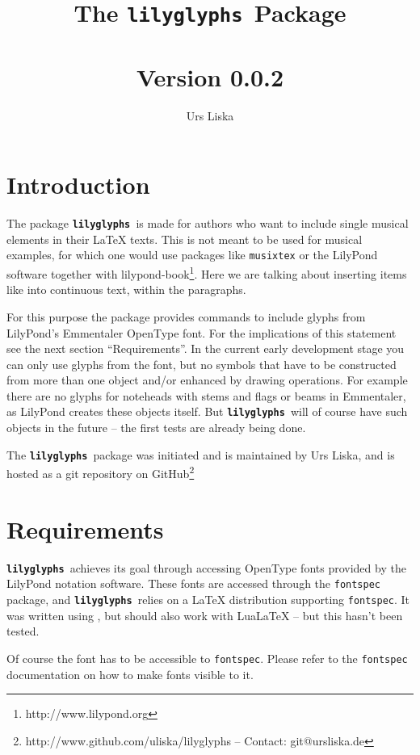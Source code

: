 \documentclass{article}
\newcommand{\lilyglyphs}{\texttt{\textbf{lilyglyphs\,}}}
\begin{document}
\title{The \lilyglyphs Package\\~\\
	\normalsize Version 0.0.2}
\author{Urs Liska}

\maketitle
\tableofcontents

\pagebreak
\section{Introduction}
The package \lilyglyphs is made for authors who want to include single musical elements in their \LaTeX{} texts. 
This is not meant to be used for musical examples, for which one would use packages like \texttt{musixtex} or the LilyPond software together with lilypond-book\footnote{http://www.lilypond.org}. 
Here we are talking about inserting items like \lilyRFZ* into continuous text, within the paragraphs.

For this purpose the package provides commands to include glyphs from LilyPond's Emmentaler OpenType font. 
For the implications of this statement see the next section \enquote{Requirements}. 
In the current early development stage you can only use glyphs from the font, but no symbols that have to be constructed from more than one object and/or enhanced by drawing operations. 
For example there are no glyphs for noteheads with stems and flags or beams in Emmentaler, as LilyPond creates these objects itself. 
But \lilyglyphs will of course have such objects in the future -- the first tests are already being done.

The \lilyglyphs package was initiated and is maintained by Urs Liska, and is hosted as a git repository on GitHub\footnote{http://www.github.com/uliska/lilyglyphs -- Contact: git@ursliska.de}

\section{Requirements}
\lilyglyphs achieves its goal through accessing OpenType fonts provided by the LilyPond notation software. 
These fonts are accessed through the \texttt{fontspec} package, and \lilyglyphs relies on a \LaTeX{} distribution supporting \texttt{fontspec}. 
It was written using \XeLaTeX, but should also work with LuaLaTeX -- but this hasn't been tested.

Of course the font has to be accessible to \texttt{fontspec}. 
Please refer to the \texttt{fontspec} documentation on how to make fonts visible to it. 
\end{document}
